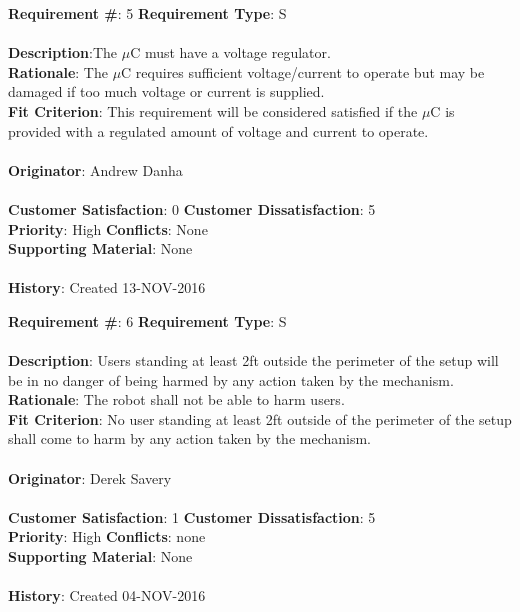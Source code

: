 \documentclass[titlepage]{article}
\begin{document}
\begin{framed}
	\noindent\textbf{Requirement \#}: 5 \hfill \textbf{Requirement Type}: S \hfill\\\\
	\noindent\textbf{Description}:The $\mu$C must have a voltage regulator.\\
	\textbf{Rationale}: The $\mu$C requires sufficient voltage/current to operate but may be damaged if too much voltage or current is supplied.\\
	\textbf{Fit Criterion}: This requirement will be considered satisfied if the $\mu$C is provided with a regulated amount of voltage and current to operate.\\\\
	\textbf{Originator}: Andrew Danha\\\\ 
	\noindent\textbf{Customer Satisfaction}: 0 \hfill 	\textbf{Customer Dissatisfaction}: 5 \hfill\\
	\textbf{Priority}: High \hfill \textbf{Conflicts}: None \hfill\\
	\textbf{Supporting Material}: None\\\\
	\noindent\textbf{History}: Created 13-NOV-2016
\end{framed}

\begin{framed}
	\noindent\textbf{Requirement \#}: 6 \hfill \textbf{Requirement Type}: S \hfill\\\\
	\noindent\textbf{Description}: Users standing at least 2ft outside the perimeter of the setup will be in no danger of being harmed by any action taken by the mechanism.\\
	\textbf{Rationale}: The robot shall not be able to harm users.\\
	\textbf{Fit Criterion}: No user standing at least 2ft outside of the perimeter of the setup shall come to harm by any action taken by the mechanism.\\\\
	\textbf{Originator}: Derek Savery\\\\
	\noindent\textbf{Customer Satisfaction}: 1 \hfill 	\textbf{Customer Dissatisfaction}: 5 \hfill\\
	\textbf{Priority}: High \hfill \textbf{Conflicts}: none \hfill\\
	\textbf{Supporting Material}: None\\\\
	\noindent\textbf{History}: Created 04-NOV-2016
\end{framed}
\newpage
\end{document}
